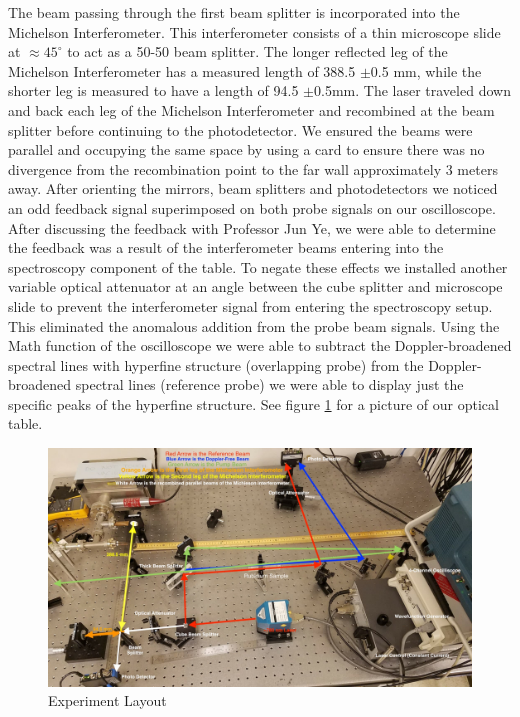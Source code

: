 \documentclass[12pt]{article}
\begin{document}
The beam passing through the first beam splitter is incorporated into the Michelson Interferometer.  This interferometer consists of a thin microscope slide at $\approx45^{\circ}$ to act as a 50-50 beam splitter. The longer reflected leg of the Michelson Interferometer has a measured length of 388.5 $\pm $0.5 mm, while the shorter leg is measured to have a length of 94.5 $\pm $0.5mm. The laser traveled down and back each leg of the Michelson Interferometer and recombined at the beam splitter before continuing to the photodetector.  We ensured the beams were parallel and occupying the same space by using a card to ensure there was no divergence from the recombination point to the far wall approximately 3 meters away. After orienting the mirrors, beam splitters and photodetectors we noticed an odd feedback signal superimposed on both probe signals on our oscilloscope. After discussing the feedback with Professor Jun Ye, we were able to determine the feedback was a result of the interferometer beams entering into the spectroscopy component of the table. To negate these effects we installed another variable optical attenuator at an angle between the cube splitter and microscope slide to prevent the interferometer signal from entering the spectroscopy setup.  This eliminated the anomalous addition from the probe beam signals.  Using the Math function of the oscilloscope we were able to subtract the Doppler-broadened spectral lines with hyperfine structure (overlapping probe) from the Doppler-broadened spectral lines (reference probe) we were able to display just the specific peaks of the hyperfine structure. See figure \ref{fig:Layout} for a picture of our optical table.

\begin{figure}[h!]
	\centering
	\includegraphics[width=\textwidth]{DFS_Layout.jpg}
	\caption{Experiment Layout}%
	\label{fig:Layout}%
\end{figure}
\end{document}
